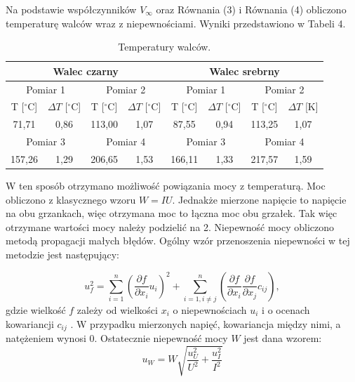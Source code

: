 \documentclass[10pt,a4paper]{article}
\begin{document}
Na podstawie współczynników $V_{\infty}$ oraz Równania (3) i Równania (4) obliczono temperaturę walców wraz z niepewnościami. Wyniki przedstawiono w Tabeli 4.

\begin{table}[h!]
\centering
\caption{Temperatury walców.}
\begin{tabular}{|c|c|c|c|c|c|c|c|}
\hline
\multicolumn{4}{|c|}{Walec czarny}                             & \multicolumn{4}{c|}{Walec srebrny}                            \\ \hline
\multicolumn{2}{|c|}{Pomiar 1} & \multicolumn{2}{c|}{Pomiar 2} & \multicolumn{2}{c|}{Pomiar 1} & \multicolumn{2}{c|}{Pomiar 2} \\ \hline
T [$^{\circ}$C]      & $\Delta T$ [$^{\circ}$C]    & T [$^{\circ}$C]     & $\Delta T$ [$^{\circ}$C]    & T [$^{\circ}$C]     & $\Delta T$ [$^{\circ}$C]    & T [$^{\circ}$C]     & $\Delta T$ [K]    \\ \hline
71,71      & 0,86              & 113,00    & 1,07              & 87,55     & 0,94              & 113,25    & 1,07              \\ \hline
\multicolumn{2}{|c|}{Pomiar 3} & \multicolumn{2}{c|}{Pomiar 4} & \multicolumn{2}{c|}{Pomiar 3} & \multicolumn{2}{c|}{Pomiar 4} \\ \hline
157,26     & 1,29              & 206,65    & 1,53              & 166,11    & 1,33              & 217,57    & 1,59              \\ \hline
\end{tabular}
\end{table}

W ten sposób otrzymano możliwość powiązania mocy z temperaturą. Moc obliczono z klasycznego wzoru $W=IU$. Jednakże mierzone napięcie to napięcie na obu grzankach, więc otrzymana moc to łączna moc obu grzałek. Tak więc otrzymane wartości mocy należy podzielić na 2. Niepewność mocy obliczono metodą propagacji małych błędów. Ogólny wzór przenoszenia niepewności w tej metodzie jest następujący:

 \begin{equation}
 u_{f}^2=\sum_{i=1}^n \left( \dfrac{\partial f}{\partial x_{i}}u_{i}\right)^2+\sum_{i=1, i\neq j}^n \left( \dfrac{\partial f}{\partial x_{i}}\dfrac{\partial f}{\partial x_{j}}c_{ij}\right),
 \end{equation}
 gdzie wielkość $f$ zależy od wielkości $x_{i}$ o niepewnościach $u_{i}$ i o ocenach kowariancji $c_{ij}$ \cite{tay1}. W przypadku mierzonych napięć, kowariancja między nimi, a natężeniem wynosi 0. Ostatecznie niepewność mocy $W$ jest dana wzorem:
 \begin{equation}
 u_{W}=W\sqrt{\dfrac{u_{U}^2}{U^2}+\dfrac{u_{I}^2}{I^2}}
 \end{equation}
\end{document}
